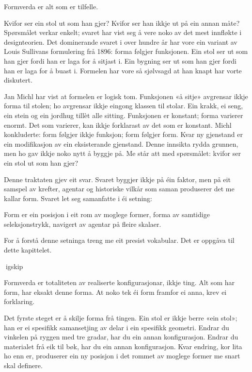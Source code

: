 
Formverda er alt som er tilfelle.

Kvifor ser ein stol ut som han gjer? Kvifor ser han ikkje ut på ein annan måte? Spørsmålet verkar enkelt; svaret har vist seg å vere noko av det mest innfløkte i designteorien. Det dominerande svaret i over hundre år har vore ein variant av Louis Sullivans formulering frå 1896: forma følgjer funksjonen. Ein stol ser ut som han gjer fordi han er laga for å sitjast i. Ein bygning ser ut som han gjer fordi han er laga for å buast i. Formelen har vore så sjølvsagd at han knapt har vorte diskutert.

Jan Michl har vist at formelen er logisk tom. Funksjonen «å sitje» avgrensar ikkje forma til stolen; ho avgrensar ikkje eingong klassen til stolar. Ein krakk, ei seng, ein stein og ein jordhug tillèt alle sitting. Funksjonen er konstant; forma varierer enormt. Det som varierer, kan ikkje forklarast av det som er konstant. Michl konkluderte: form følgjer ikkje funksjon; form følgjer form. Kvar ny gjenstand er ein modifikasjon av ein eksisterande gjenstand. Denne innsikta rydda grunnen, men ho gav ikkje noko nytt å byggje på. Me står att med spørsmålet: kvifor ser ein stol ut som han gjer?

Denne traktaten gjev eit svar. Svaret byggjer ikkje på éin faktor, men på eit samspel av krefter, agentar og historiske vilkår som saman produserer det me kallar form. Svaret let seg samanfatte i éi setning:

\begin{overgang}
Form er ein posisjon i eit rom av moglege former, forma av samtidige seleksjonstrykk, navigert av agentar på fleire skalaer.
\end{overgang}

For å forstå denne setninga treng me eit presist vokabular. Det er oppgåva til dette kapittelet.

igskip

Formverda er totaliteten av realiserte konfigurasjonar, ikkje ting. Alt som har form, har eksakt denne forma. At noko tek éi form framfor ei anna, krev ei forklaring.

Det fyrste steget er å skilje forma frå tingen. Ein stol er ikkje berre «ein stol»; han er ei spesifikk samansetjing av delar i ein spesifikk geometri. Endrar du vinkelen på ryggen med tre gradar, har du ein annan konfigurasjon. Endrar du materialet frå eik til bøk, har du ein annan konfigurasjon. Kvar endring, kor lita ho enn er, produserer ein ny posisjon i det rommet av moglege former me snart skal definere.

